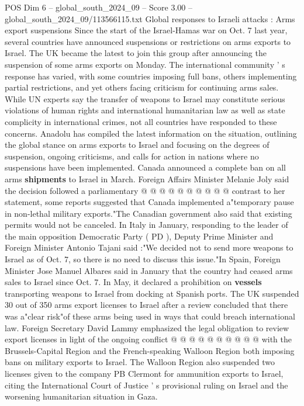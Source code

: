 \begin{textsample}{POS Dim 6 – global\_south\_2024\_09 – Score 3.00 – global\_south\_2024\_09/113566115.txt}  \label{ex:f6_pos_425}
Global responses to Israeli attacks : Arms export suspensions Since the start of the Israel-Hamas war on Oct. 7 last year, several countries have announced suspensions or restrictions on arms exports to Israel.
The UK became the latest to join this group after announcing the suspension of some arms exports on Monday.
The international community ' s response has varied, with some countries imposing full bans, others implementing partial restrictions, and yet others facing criticism for continuing arms sales.
While UN experts say the transfer of weapons to Israel may constitute serious violations of human rights and international humanitarian law as well as state complicity in international crimes, not all countries have responded to these concerns.
Anadolu has compiled the latest information on the situation, outlining the global stance on arms exports to Israel and focusing on the degrees of suspension, ongoing criticisms, and calls for action in nations where no suspensions have been implemented.
Canada announced a complete ban on all arms \textbf{shipments} to Israel in March.
Foreign Affairs Minister Melanie Joly said the decision followed a parliamentary @ @ @ @ @ @ @ @ @ @ contrast to her statement, some reports suggested that Canada implemented a"temporary pause in non-lethal military exports."The Canadian government also said that existing permits would not be canceled.
In Italy in January, responding to the leader of the main opposition Democratic Party ( PD ), Deputy Prime Minister and Foreign Minister Antonio Tajani said :"We decided not to send more weapons to Israel as of Oct. 7, so there is no need to discuss this issue."In Spain, Foreign Minister Jose Manuel Albares said in January that the country had ceased arms sales to Israel since Oct. 7.
In May, it declared a prohibition on \textbf{vessels} transporting weapons to Israel from docking at Spanish ports.
The UK suspended 30 out of 350 arms export licenses to Israel after a review concluded that there was a"clear risk"of these arms being used in ways that could breach international law.
Foreign Secretary David Lammy emphasized the legal obligation to review export licenses in light of the ongoing conflict @ @ @ @ @ @ @ @ @ @ with the Brussels-Capital Region and the French-speaking Walloon Region both imposing bans on military exports to Israel.
The Walloon Region also suspended two licenses given to the company PB Clermont for ammunition exports to Israel, citing the International Court of Justice ' s provisional ruling on Israel and the worsening humanitarian situation in Gaza.

\end{textsample}

